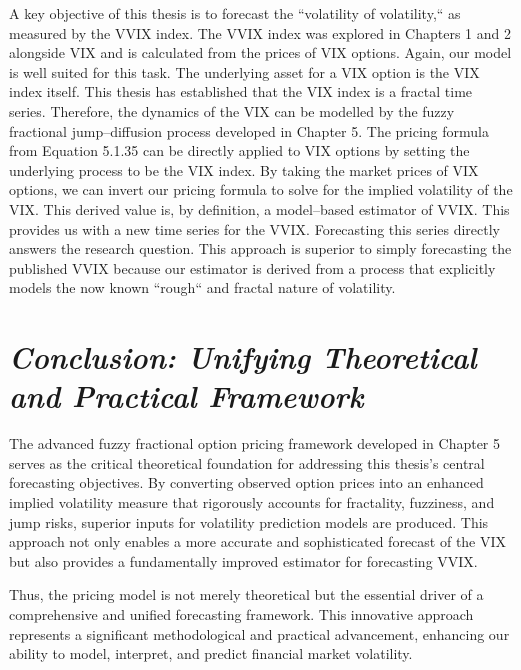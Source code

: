\documentclass[12pt,a4paper]{report}
\numberwithin{equation}{section}
\begin{document}
A key objective of this thesis is to forecast the ``volatility of
volatility,`` as measured by the VVIX index. The VVIX index was explored
in Chapters 1 and 2 alongside VIX and is calculated from the prices of
VIX options. Again, our model is well suited for this task. The
underlying asset for a VIX option is the VIX index itself. This thesis
has established that the VIX index is a fractal time series. Therefore,
the dynamics of the VIX can be modelled by the fuzzy fractional
jump--diffusion process developed in Chapter 5. The pricing formula from
Equation 5.1.35 can be directly applied to VIX options by setting the
underlying process to be the VIX index. By taking the market prices of
VIX options, we can invert our pricing formula to solve for the implied
volatility of the VIX. This derived value is, by definition, a
model--based estimator of VVIX. This provides us with a new time series
for the VVIX. Forecasting this series directly answers the research
question. This approach is superior to simply forecasting the published
VVIX because our estimator is derived from a process that explicitly
models the now known ``rough`` and fractal nature of volatility.

\hypertarget{conclusion--unifying--theoretical--and--practical--framework}{%
\section{\texorpdfstring{\emph{\textbf{Conclusion: Unifying
Theoretical and Practical
Framework}}}{Conclusion: Unifying Theoretical and Practical Framework}}\label{conclusion--unifying--theoretical--and--practical--framework}}

The advanced fuzzy fractional option pricing framework developed in
Chapter 5 serves as the critical theoretical foundation for addressing
this thesis's central forecasting objectives. By converting observed
option prices into an enhanced implied volatility measure that
rigorously accounts for fractality, fuzziness, and jump risks, superior
inputs for volatility prediction models are produced. This approach not
only enables a more accurate and sophisticated forecast of the VIX but
also provides a fundamentally improved estimator for forecasting VVIX.

Thus, the pricing model is not merely theoretical but the essential
driver of a comprehensive and unified forecasting framework. This
innovative approach represents a significant methodological and
practical advancement, enhancing our ability to model, interpret, and
predict financial market volatility.
\end{document}
